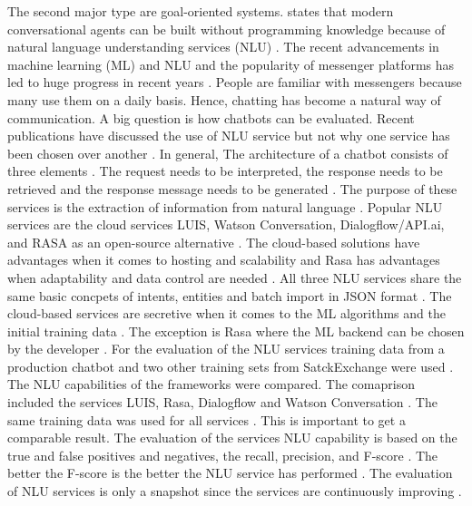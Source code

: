 The second major type are goal-oriented systems.
\citet{braunEvaluatingNLU} states that modern conversational agents can be built without programming 
knowledge because of natural language understanding services (NLU) \cite{braunEvaluatingNLU}. 
The recent advancements in machine learning (ML) and NLU and the popularity of messenger platforms 
has led to huge progress in recent years \cite{braunEvaluatingNLU}. 
People are familiar with messengers because many use them on a daily basis.
Hence, chatting has become a natural way of communication.
A big question is how chatbots can be evaluated.
Recent publications have discussed the use of NLU service but not why 
one service has been chosen over another \cite{braunEvaluatingNLU}.
In general, The architecture of a chatbot consists of three elements \cite{braunEvaluatingNLU}. 
The request needs to be interpreted, the response needs to be retrieved and the response message
needs to be generated \cite{braunEvaluatingNLU}. 
The purpose of these services is the extraction of information from natural language \cite{braunEvaluatingNLU}. 
Popular NLU services are the cloud services LUIS, Watson Conversation, Dialogflow/API.ai, and RASA as an open-source alternative \cite{braunEvaluatingNLU}. 
The cloud-based solutions have advantages when it comes to hosting and scalability and Rasa has advantages
when adaptability and data control are needed \cite{braunEvaluatingNLU}. 
All three NLU services share the same basic concpets of intents, entities and batch import in JSON format \cite{braunEvaluatingNLU}.
The cloud-based services are secretive when it comes to the ML algorithms and the initial training data \cite{braunEvaluatingNLU}. 
The exception is Rasa where the ML backend can be chosen by the developer \cite{braunEvaluatingNLU}. 
For the evaluation of the NLU services training data from a production chatbot and two other training sets 
from SatckExchange were used \cite{braunEvaluatingNLU}. 
The NLU capabilities of the frameworks were compared.
The comaprison included the services LUIS, Rasa, Dialogflow and Watson Conversation \cite{braunEvaluatingNLU}. 
The same training data was used for all services \cite{braunEvaluatingNLU}. 
This is important to get a comparable result.
The evaluation of the services NLU capability is based on the true and false positives and negatives, 
the recall, precision, and F-score \cite{braunEvaluatingNLU}. 
The better the F-score is the better the NLU service has performed \cite{braunEvaluatingNLU}. 
The evaluation of NLU services is only a snapshot since the services are continuously improving \cite{braunEvaluatingNLU}. 

